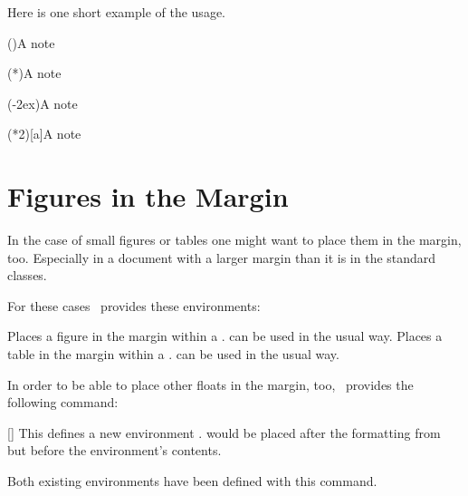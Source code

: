 \documentclass[load-preamble+]{cnltx-doc}
\begin{document}
Here is one short example of the usage.

\begin{sourcecode}
 
 
  \sidenote(){A note}
 
  \sidenote(*){A note}
 
  \sidenote(-2ex){A note}
 
  \sidenote(*2)[a]{A note}
\end{sourcecode}

\section{Figures in the Margin}\label{sec:figures-margin}
In the case of small figures or tables one might want to place them in the
margin, too.  Especially in a document with a larger margin than it is in the
standard classes.

For these cases \snotez\ provides these environments:
\begin{environments}
    Places a figure in the margin within a .   can
    be used in the usual way.
    Places a table in the margin within a .   can
    be used in the usual way.
\end{environments}

In order to be able to place other floats in the margin, too, \snotez\
provides the following command:
\begin{commands}
  []
    This defines a new environment .   would
    be placed after the formatting from \option{sidefloat-format} but before
    the environment's contents.
\end{commands}
Both existing environments have been defined with this command.
\begin{sourcecode}
\end{sourcecode}
\end{document}
